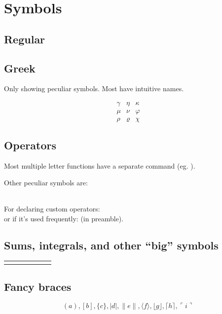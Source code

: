 \section{Symbols}
\subsection*{Regular}
\subsection*{Greek}
Only showing peculiar symbols. Most have intuitive names.\\
\begin{example}
\[\begin{matrix}
  \gamma & \eta    & \kappa\\
  \mu    & \nu     & \varphi\\
  \rho   & \varrho & \chi
\end{matrix}\]
\end{example}
\subsection*{Operators}
Most multiple letter functions have a separate command (eg. \mcodeshow{\sin}).

Other peculiar symbols are:\\
\mcodeshow{\liminf}\\
\mcodeshow{\limsup}

For declaring custom operators:
\\
or if it's used frequently: \code{\DeclareMathOperator*{\atan}{atan}} (in preamble).
\pagebreak
\subsection*{Sums, integrals, and other ``big'' symbols}
\begin{longtable}{l l | l l | l l}
  \codeshowB{\sum      }{\prod      }{\coprod}
  \codeshowB{\bigoplus }{\bigotimes }{\bigodot}
  \codeshowB{\bigcup   }{\bigcap    }{\biguplus}
  \codeshowB{\bigsqcup }{\bigvee    }{\bigwedge}
  \codeshowB{\int      }{\oint      }{\iint}
  \codeshowB{\iiint    }{\iiiint    }{\idotsint}
\end{longtable}

\subsection*{Fancy braces}
\begin{example}
\[
( a ), [ b ], \{ c \}, | d |, \| e \|,
\langle f \rangle, \lfloor g \rfloor,
\lceil h \rceil, \ulcorner i \urcorner
\]
\end{example}

